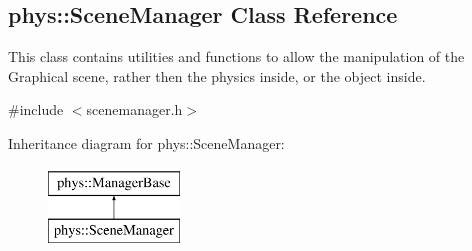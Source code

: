 \hypertarget{classphys_1_1SceneManager}{
\subsection{phys::SceneManager Class Reference}
\label{dd/da8/classphys_1_1SceneManager}
}


This class contains utilities and functions to allow the manipulation of the Graphical scene, rather then the physics inside, or the object inside.  




{\ttfamily \#include $<$scenemanager.h$>$}

Inheritance diagram for phys::SceneManager:\begin{figure}[H]
\begin{center}
\leavevmode
\includegraphics[height=2.000000cm]{dd/da8/classphys_1_1SceneManager}
\end{center}
\end{figure}

